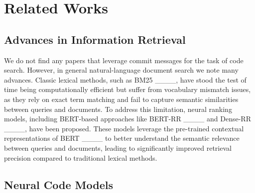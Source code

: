 \section{Related Works}
\label{lit_review}
\subsection{Advances in Information Retrieval}
We do not find any papers that leverage commit messages for the task of code search. However, in general natural-language document search we note many advances. Classic lexical methods, such as BM25 ____, have stood the test of time being computationally efficient but suffer from vocabulary mismatch issues, as they rely on exact term matching and fail to capture semantic similarities between queries and documents. To address this limitation, neural ranking models, including BERT-based approaches like BERT-RR ____ and Dense-RR ____, have been proposed. These models leverage the pre-trained contextual representations of BERT ____ to better understand the semantic relevance between queries and documents, leading to significantly improved retrieval precision compared to traditional lexical methods.

\subsection{Neural Code Models}


